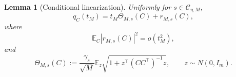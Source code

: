 \documentclass[11pt]{article}
\newtheorem{lemma}{Lemma}
\newcommand{\Ebb}{\mathbb E}
\newcommand{\1}{\mathbf 1}
\begin{document}
\begin{lemma}[Conditional linearization]
\label{lem:conditional-linearization}
Uniformly for \(s\in\mathcal C_{\eta,M}\),
\begin{equation}
        q_C(t_M)
        =
        t_M\Theta_{M,s}(C)+r_{M,s}(C),
        \label{eq:conditional-linearization}
\end{equation}
where
\begin{equation}
        \Ebb_C|r_{M,s}(C)|^2=o(t_M^2),
        \label{eq:conditional-remainder-L2}
\end{equation}
and
\begin{equation}
        \Theta_{M,s}(C)
        :=
        \frac{\gamma_s}{\sqrt M}
        \Ebb_z
        \sqrt{1+z^\top(CC^\top)^{-1}z},
        \qquad
        z\sim N(0,I_m).
        \label{eq:theta-def}
\end{equation}
\end{lemma}
\end{document}
